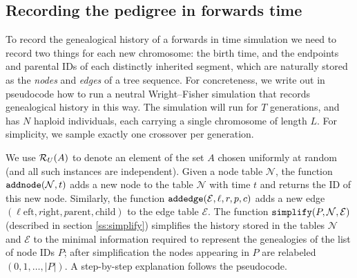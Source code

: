\documentclass{article}
\newcommand{\Nt}{\mathcal{N}}  %
\newcommand{\Et}{\mathcal{E}}  %
\newcommand{\taddnode}[1]{\mbox{\texttt{addnode}}(#1)}
\newcommand{\taddedge}[1]{\mbox{\texttt{addedge}}(#1)}
\newcommand{\tsimplify}[1]{\mbox{\texttt{simplify}}(#1)}
\begin{document}
\subsection*{Recording the pedigree in forwards time}

To record the genealogical history of a forwards in time simulation
we need to record two things for each new chromosome:
the birth time, and the endpoints and parental IDs of each distinctly inherited segment,
which are naturally stored as the \emph{nodes} and \emph{edges} of a tree sequence.
For concreteness, we write out in pseudocode how to run a neutral Wright--Fisher simulation
that records genealogical history in this way.
The simulation will run for $T$ generations,
and has $N$ haploid individuals, each carrying a single chromosome of length $L$.
For simplicity, we sample exactly one crossover per generation.

We use $\mathcal{R}_U(A)$ to denote an element of the set $A$ chosen uniformly at random
(and all such instances are independent).
Given a node table $\Nt$, the function $\taddnode{\Nt, t}$
adds a new node to the table $\Nt$ with time $t$
and returns the ID of this new node.
Similarly, the function $\taddedge{\Et, \ell, r, p, c}$
adds a new edge $(\ell\mathrm{eft}, r\mathrm{ight}, p\mathrm{arent}, c\mathrm{hild})$ to the edge table $\Et$.
The function $\tsimplify{P, \Nt, \Et}$ (described in section \ref{ss:simplify})
simplifies the history stored in the tables $\Nt$ and $\Et$
to the minimal information required to represent the genealogies of the list of node IDs $P$;
after simplification the nodes appearing in $P$ are relabeled $(0, 1, \ldots, |P|)$.
A step-by-step explanation follows the pseudocode.
\end{document}
